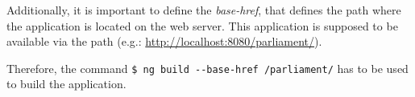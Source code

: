 Additionally, it is important to define the \textit{base-href}, that defines the path where the application is located on the web server. This application is supposed to be available via the path  (e.g.: \url{http://localhost:8080/parliament/}).


Therefore, the command \texttt{\$ ng build -{}-base-href /parliament/} has to be used to build the application.
